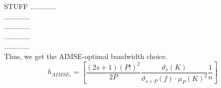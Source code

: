 \documentclass[11pt]{article}
\begin{document}
STUFF
.............\\
.............\\
.............\\
.............\\
.............\\

Thus, we get the AIMSE-optimal bandwidth choice.
$$
h_{AIMSE_s} = \left[ \frac{(2s+1)(P!)^2}{2P} \frac{\vartheta_s(K)}{\vartheta_{s+P}(f) \cdot \mu_P(K)^2} \frac{1}{n} \right]$$

\end{document}
